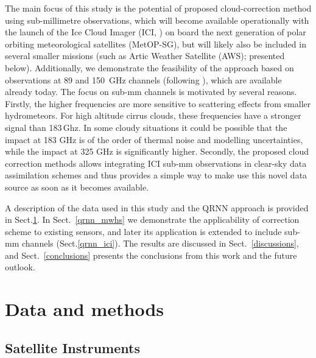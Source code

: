 \documentclass[amt, manuscript]{copernicus}
\begin{document}
The main focus of this study is the potential of proposed cloud-correction
method using sub-millimetre observations, which will become available
operationally with the launch of the Ice Cloud Imager (ICI,
\citet{eriksson:towar:20}) on board the next generation of polar orbiting
meteorological satellites (MetOP-SG), but will likely also be included in
several smaller missions (such as Artic Weather Satellite (AWS); presented
below). Additionally, we demonstrate the feasibility of the approach based on
observations at 89 and 150\ GHz channels (following
\citet{geer2015scatteringindex}), which are available already today. The focus
on sub-mm channels is motivated by several reasons. Firstly, the higher
frequencies are more sensitive to scattering effects from smaller
hydrometeors. For high altitude cirrus clouds, these frequencies have a stronger
signal than 183\,Ghz. In some cloudy situations it could be possible that the
impact at 183 GHz is of the order of thermal noise and modelling uncertainties,
while the impact at 325 GHz is significantly higher. Secondly, the proposed
cloud correction methods allows integrating ICI sub-mm observations in
clear-sky data assimilation schemes and thus provides a simple
way to make use this novel data source as soon as it becomes available.

A description of the data used in this study and the QRNN approach is provided
in Sect.\ref{data_methods}. In Sect.~\ref{qrnn_mwhs} we demonstrate the
applicability of correction scheme to existing sensors, and later its
application is extended to include sub-mm channels (Sect.\ref{qrnn_ici}). The
results are discussed in Sect.~\ref{discussions}, and Sect.~\ref{conclusions}
presents the conclusions from this work and the future outlook.


\section{Data and methods}
\label{data_methods}
%
\subsection{Satellite Instruments}
%
\end{document}
